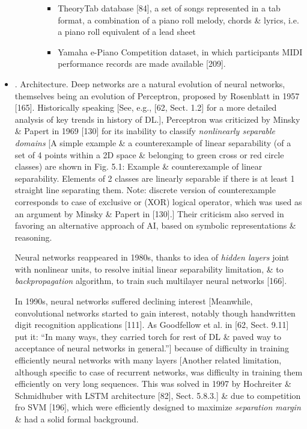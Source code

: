 \documentclass{article}
\begin{document}
\begin{itemize}
\begin{itemize}
\begin{itemize}
\begin{itemize}
				\item TheoryTab database [84], a set of songs represented in a tab format, a combination of a piano roll melody, chords \& lyrics, i.e. a piano roll equivalent of a lead sheet
				\item Yamaha e-Piano Competition dataset, in which participants MIDI performance records are made available [209].
			\end{itemize}
		\end{itemize}
	\end{itemize}
	\item {. Architecture.} Deep networks are a natural evolution of neural networks, themselves being an evolution of Perceptron, proposed by {\sc Rosenblatt} in 1957 [165]. Historically speaking [See, e.g., [62, Sect. 1.2] for a more detailed analysis of key trends in history of DL.], Perceptron was criticized by {\sc Minsky \& Papert} in 1969 [130] for its inability to classify {\it nonlinearly separable domains} [A simple example \& a counterexample of linear separability (of a set of 4 points within a 2D space \& belonging to green cross or red circle classes) are shown in {\sf Fig. 5.1: Example \& counterexample of linear separability.} Elements of 2 classes are linearly separable if there is at least 1 straight line separating them. Note: discrete version of counterexample corresponds to case of exclusive or (XOR) logical operator, which was used as an argument by {\sc Minsky \& Papert} in [130].] Their criticism also served in favoring an alternative approach of AI, based on symbolic representations \& reasoning.

	Neural networks reappeared in 1980s, thanks to idea of {\it hidden layers} joint with nonlinear units, to resolve initial linear separability limitation, \& to {\it backpropagation} algorithm, to train such multilayer neural networks [166].

	In 1990s, neural networks suffered declining interest [Meanwhile, convolutional networks started to gain interest, notably though handwritten digit recognition applications [111]. As Goodfellow et al. in [62, Sect. 9.11] put it: ``In many ways, they carried torch for rest of DL \& paved way to acceptance of neural networks in general.''] because of difficulty in training efficiently neural networks with many layers [Another related limitation, although specific to case of recurrent networks, was difficulty in training them efficiently on very long sequences. This was solved in 1997 by {\sc Hochreiter \& Schmidhuber} with LSTM architecture [82], Sect. 5.8.3.] \& due to competition fro SVM [196], which were efficiently designed to maximize {\it separation margin} \& had a solid formal background.


\end{itemize}
\end{document}
